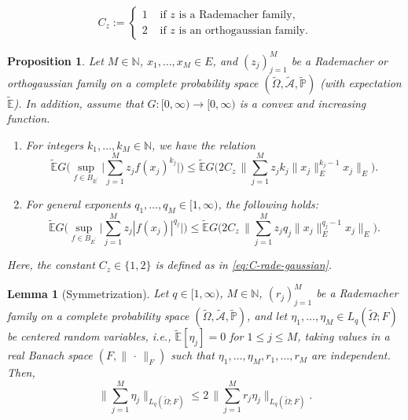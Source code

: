 \documentclass[10pt,a4paper]{amsart}
\newtheorem{proposition}{Proposition}
\newtheorem{lemma}{Lemma}
\newcommand{\Omegat}{\widetilde{\Omega}}
\newcommand{\bbE}{\mathbb{E}}
\newcommand{\bbEt}{\widetilde{\bbE}}
\newcommand{\bbN}{\mathbb{N}}
\newcommand{\bbP}{\mathbb{P}}
\newcommand{\bbPt}{\widetilde{\bbP}}
\newcommand{\cA}{\mathcal{A}}
\newcommand{\cAt}{\widetilde{\cA}}
\newcommand{\dual}[1]{{#1}^{\prime}}
\newcommand{\from}{\colon}
\newcommand{\norm}[2]{     \| #1       \|_{ #2 }}
\begin{document}
	\begin{equation}\label{eq:C-rade-gaussian} 
	C_z 
	:= 
	\begin{cases} 
	1 &\text{ if $z$ is a Rademacher family} , 
	\\
	2 &\text{ if $z$ is an orthogaussian family}. 
	\end{cases} 
	\end{equation}

\begin{proposition}\label{prop:rade-gaussian}  
	Let $M\in\bbN$, 
	$x_1,\ldots,x_M\in E$, 
	and $(z_j)_{j=1}^M$ be 
	a Rademacher or 
	orthogaussian family 
	on a complete probability space 
	$(\Omegat,\cAt,\bbPt)$ 
	(with expectation $\bbEt$). 
	In addition, assume that 
	$G\from [0,\infty) \to [0,\infty)$ 
	is a convex and increasing function. 
	\begin{enumerate}[leftmargin=1cm] 
		\item\label{prop:rade-gaussian-poly}  
		For integers $k_1, \ldots, k_M\in\bbN$,  
		we have the relation  
		\begin{equation}\label{eq:prop:rade-gaussian-poly} 
		\bbEt 
		G\Biggl( 
		\sup_{f\in B_{\dual{E}}}  
		\biggl| 
		\sum_{j=1}^M 
		z_j f(x_j)^{k_j} \biggr| 
		\Biggr) 
		\leq 
		\bbEt 
		G\Biggl(  
		2 C_z \, 
		\biggl\| 
		\sum_{j=1}^M 
		z_j k_j \norm{x_j}{E}^{k_j-1} x_j \biggr\|_E 
		\Biggr).  
		\end{equation}
		\item\label{prop:rade-gaussian-q}   
		For general exponents 
		$q_1,\ldots,q_M\in[1,\infty)$,  
		the following holds: 
		\begin{equation}\label{eq:prop:rade-gaussian-q} 
		\bbEt 
		G\Biggl(  
		\sup_{f\in B_{\dual{E}}}  
		\biggl| 
		\sum_{j=1}^M 
		z_j |f(x_j)|^{q_j} \biggr| 
		\Biggr) 
		\leq 
		\bbEt 
		G\Biggl(  
		2 C_z \, 
		\biggl\| 
		\sum_{j=1}^M 
		z_j q_j \norm{x_j}{E}^{q_j-1}  x_j \biggr\|_E 
		\Biggr). 
		\end{equation} 
	\end{enumerate}
	Here, the constant $C_z\in\{1,2\}$ is defined 
	as in \eqref{eq:C-rade-gaussian}. 
\end{proposition} 

\begin{lemma}[Symmetrization]
	\label{lem:symmetrization} 
	Let  $q\in[1,\infty)$, $M\in\bbN$, $(r_j)_{j=1}^M$ be 
	a Rademacher family on a complete probability space 
	$(\Omegat,\cAt,\bbPt)$, 
	and let $\eta_1,\ldots,\eta_M\in L_q(\Omegat;F)$ be 
	centered random variables, 
	i.e., $\bbEt[\eta_j]=0$ for $1\leq j \leq M$, 
	taking values 
	in a real Banach space $(F,\norm{\,\cdot\,}{F})$ 
	such that $\eta_1,\ldots,\eta_M, r_1, \ldots, r_M$ are independent. 
	Then, 
	\[
	\biggl\| 
	\sum_{j=1}^M \eta_j 
	\biggr\|_{L_q(\Omegat;F)} 
	\leq 
	2 \, 
	\biggl\| 
	\sum_{j=1}^M r_j \eta_j 
	\biggr\|_{L_q(\Omegat;F)} . 
	\]
\end{lemma} 
\end{document}

